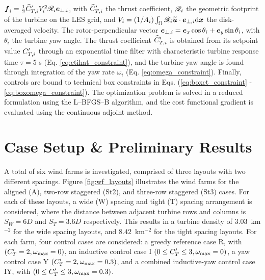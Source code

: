 \documentclass[a4paper]{jpconf}
\begin{document}
$\boldsymbol{f}_i = \frac{1}{2} \widehat{C}_{T,i}' V_i^2 \mathscr{R}_i \boldsymbol{e}_{\perp,i}$,
with $\widehat{C}_{T,i}'$ the thrust coefficient, $\mathscr{R}_i$ the geometric footprint of the turbine on the LES grid, and $V_i = (1/A_i) \int_{\Omega} \mathscr{R}_i \widetilde{\boldsymbol{u}} \cdot \boldsymbol{e}_{\perp,i} \text{d}\boldsymbol{x}$ the disk-averaged velocity. The rotor-perpendicular vector $\boldsymbol{e}_{\perp,i} = \boldsymbol{e}_x \cos \theta_i + \boldsymbol{e}_y \sin \theta_i$, with $\theta_i$ the turbine yaw angle. 
The thrust coefficient $\widehat{C}_{T,i}'$ is obtained from its setpoint value $C_{T,i}'$ through an exponential time filter with characteristic turbine response time $\tau = 5$ s (Eq. \ref{eq:ctihat_constraint}), and the turbine yaw angle is found through integration of the yaw rate $\omega_i$ (Eq. \ref{eq:omega_constraint}). Finally, controls are bound to technical box constraints in Eqs. (\ref{eq:boxct_constraint} - \ref{eq:boxomega_constraint}).
The optimization problem is solved in a reduced formulation using the L--BFGS--B algorithm, and the cost functional gradient is evaluated using the continuous adjoint method. 

\section{Case Setup \& Preliminary Results}

A total of six wind farms is investigated, comprised of three layouts with two different spacings. Figure \ref{fig:wf_layouts} illustrates the wind farms for the aligned (A), two-row staggered (St2), and three-row staggered (St3) cases. For each of these layouts, a wide (W) spacing and tight (T) spacing arrangement is considered, where the distance between adjacent turbine rows and columns is $S_W = 6D$ and $S_T = 3.6D$ respectively. This results in a turbine density of $3.03$~km$^{-2}$ for the wide spacing layouts, and $8.42$~km$^{-2}$ for the tight spacing layouts. For each farm, four control cases are considered: 
a greedy reference case R, with $(C_{T}'=2, \omega_{\rm max} = 0)$,
an inductive control case I $(0 \leq C_{T}' \leq 3, \omega_{\rm max} = 0)$,
a yaw control case Y $(C_{T}'=2, \omega_{\rm max} = 0.3)$,
and a combined inductive-yaw control case IY, with $(0 \leq C_{T}' \leq 3, \omega_{\rm max} = 0.3)$. 

\end{document}
